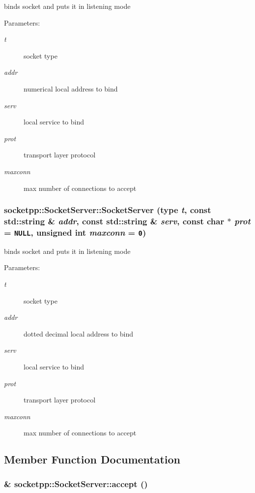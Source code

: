 binds socket and puts it in listening mode 

\begin{Desc}
\item[Parameters:]
\begin{description}
\item[{\em t}]socket type \item[{\em addr}]numerical local address to bind \item[{\em serv}]local service to bind \item[{\em prot}]transport layer protocol \item[{\em maxconn}]max number of connections to accept \end{description}
\end{Desc}
\hypertarget{classsocketpp_1_1SocketServer_667f8c2b7b1325c80f018ecf85a9551f}{
\subsubsection[{SocketServer}]{\setlength{\rightskip}{0pt plus 5cm}socketpp::SocketServer::SocketServer ({\bf type} {\em t}, \/  const std::string \& {\em addr}, \/  const std::string \& {\em serv}, \/  const char $\ast$ {\em prot} = {\tt NULL}, \/  unsigned int {\em maxconn} = {\tt 0})}}
\label{classsocketpp_1_1SocketServer_667f8c2b7b1325c80f018ecf85a9551f}


binds socket and puts it in listening mode 

\begin{Desc}
\item[Parameters:]
\begin{description}
\item[{\em t}]socket type \item[{\em addr}]dotted decimal local address to bind \item[{\em serv}]local service to bind \item[{\em prot}]transport layer protocol \item[{\em maxconn}]max number of connections to accept \end{description}
\end{Desc}


\subsection{Member Function Documentation}
\hypertarget{classsocketpp_1_1SocketServer_de24bd723d353d62d034718a1d95c02f}{
\subsubsection[{accept}]{ \& socketpp::SocketServer::accept ()}}
\label{classsocketpp_1_1SocketServer_de24bd723d353d62d034718a1d95c02f}


